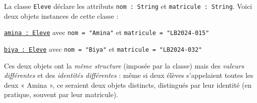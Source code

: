 \documentclass[11pt]{article}
\begin{document}
\begin{exemplebox}
La classe \texttt{Eleve} déclare les attributs \texttt{nom : String} et \texttt{matricule : String}. Voici deux objets instances de cette classe :

\texttt{\underline{amina : Eleve}} avec \texttt{nom = "Amina"} et \texttt{matricule = "LB2024-015"}

\texttt{\underline{biya : Eleve}} avec \texttt{nom = "Biya"} et \texttt{matricule = "LB2024-032"}

Ces deux objets ont la \emph{même structure} (imposée par la classe) mais des \emph{valeurs différentes} et des \emph{identités différentes} : même si deux élèves s'appelaient toutes les deux « Amina », ce seraient deux objets distincts, distingués par leur identité (en pratique, souvent par leur matricule).
\end{exemplebox}
\end{document}
